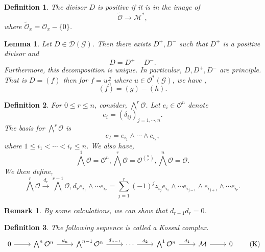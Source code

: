 \documentclass{article}
\newtheorem{definition}{Definition}[section]
\newtheorem{lemma}{Lemma}[section]
\newtheorem{remark}{Remark}[section]
\newcommand{\G}[0]{\mathcal{G}}
\newcommand{\Ouv}[0]{\mathcal{O}}
\begin{document}
\begin{definition}
  The divisor $D$ is positive if it is in the image of 
  \begin{equation*}
    \tilde{\Ouv}\to\mathcal{M}^*,
  \end{equation*}
  where $\tilde{\Ouv}_x = \Ouv_x-\{0\}$.
\end{definition}
\begin{lemma}
  Let $D\in\mathcal{D}(\G)$. Then there exists $D^+,D^-$ such that $D^+$ is a positive divisor and 
  \begin{equation*}
    D = D^+-D^-.
  \end{equation*}
  Furthermore, this decomposition is unique. In particular, $D,D^+,D^-$ are principle. That is $D=(f)$ then for $f=u{\frac g h}$ where $u\in\Ouv^*(\G)$, we have ,
  \begin{equation*}
    (f)=(g)-(h).
  \end{equation*}
\end{lemma}
\begin{definition}
  For $0\leq r\leq n$, consider, $\bigwedge^r\Ouv$. Let $e_i\in\Ouv^n$ denote
  \begin{equation*}
    e_i = (\delta_{ij})_{j=1,\cdots,n}.
  \end{equation*}
  The basis for $\bigwedge^r\Ouv$ is 
  \begin{equation*}
    e_I = e_{i_1}\wedge\cdots\wedge c_{i_r},
  \end{equation*}
  where $1\leq i_1<\cdots<i_r\leq n$. We also have,
  \begin{equation*}
    \bigwedge^1\Ouv = \Ouv^n,\bigwedge^r\Ouv = \Ouv^{{n\choose r}}, \bigwedge^n\Ouv = \Ouv.
  \end{equation*}
  We then define,
  \begin{equation*}
    \bigwedge^r\Ouv\stackrel{d_r}{\to}\bigwedge^{r-1}\Ouv, d_re_{i_1}\wedge\cdots e_{i_r} = \sum_{j=1}^r (-1)^j z_{i_j}e_{i_1}\wedge\cdots e_{i_{j-1}}\wedge e_{i_{j+1}}\wedge\cdots e_{i_r}.
  \end{equation*}
\end{definition}
\begin{remark}
  By some calculations, we can show that $d_{r-1}d_r=0$.
\end{remark}
\begin{definition}
  The following sequence is called a Kossul complex.
  \label{definition_kossul_complex}
  \begin{equation*}
    \begin{tikzcd}
0 \arrow[r] & \bigwedge^n\Ouv^n \arrow[r, "d_n"] & \bigwedge^{n-1}\Ouv^n \arrow[r, "d_{n-1}"] & \cdots \arrow[r, "d_2"] & \bigwedge^1\Ouv^n \arrow[r, "d_1"] & \mathcal{M} \arrow[r] & 0
\end{tikzcd}\tag{K}\label{equation_kossul_complex}
  \end{equation*}
\end{definition}
\end{document}

